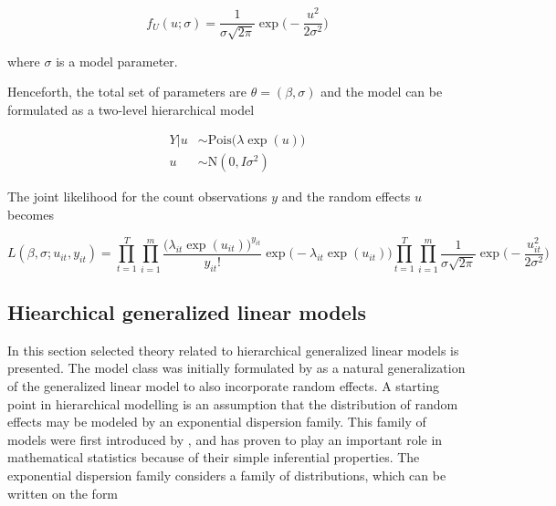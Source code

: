 \documentclass[preprint, 3p, authoryear]{elsarticle} %
\begin{document}
\begin{equation}
  f_U(u;\sigma)=\frac{1}{\sigma\sqrt{2\pi}}\exp\Bigg(-\frac{u^2}{2\sigma^2}\Bigg)
\end{equation}

where \(\sigma\) is a model parameter.

Henceforth, the total set of parameters are \(\theta=(\beta,\sigma)\) and the model can be formulated as a two-level hierarchical model

\begin{subequations} \label{eq:PoisN}
  \begin{alignat}{2}
    {Y|u} &\sim \mathrm{Pois} \big( \lambda \exp(u) \big) \label{eq:pois_n0} \\ 
    {u} &\sim \mathrm{N}({0},I\sigma^2) \label{eq:pois_n1}
  \end{alignat}
\end{subequations}

The joint likelihood for the count observations \(y\) and the random effects \(u\) becomes

\begin{equation}\label{eq:jnllPoisN}
  L(\beta, \sigma;u_{it},y_{it})=\prod_{t=1}^{T}\prod_{i=1}^{m} \frac{\big(\lambda_{it}\exp(u_{it})\big)^{y_{it}}}{y_{it}!}\exp\big(-\lambda_{it}\exp(u_{it})\big) \prod_{t=1}^{T}\prod_{i=1}^{m} \frac{1}{\sigma\sqrt{2\pi}}\exp\Bigg(-\frac{u_{it}^2}{2\sigma^2}\Bigg)
\end{equation}

\hypertarget{hiearchical-generalized-linear-models}{%
\subsection{\texorpdfstring{Hiearchical generalized linear models \label{hglm}}{Hiearchical generalized linear models }}\label{hiearchical-generalized-linear-models}}

In this section selected theory related to hierarchical generalized linear models is presented. The model class was initially formulated by \citet{Lee_1996} as a natural generalization of the generalized linear model to also incorporate random effects. A starting point in hierarchical modelling is an assumption that the distribution of random effects may be modeled by an exponential dispersion family. This family of models were first introduced by \citet{Fisher_1922}, and has proven to play an important role in mathematical statistics because of their simple inferential properties. The exponential dispersion family considers a family of distributions, which can be written on the form
\end{document}
